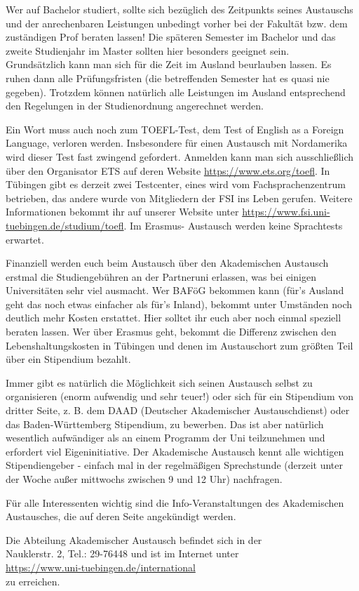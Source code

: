 Wer auf Bachelor studiert, sollte sich bezüglich des Zeitpunkts seines Austauschs und der anrechenbaren Leistungen unbedingt vorher bei der Fakultät bzw. dem zuständigen Prof beraten lassen! Die späteren Semester im Bachelor und das zweite Studienjahr im Master sollten hier besonders geeignet sein.\\
Grundsätzlich kann man sich für die Zeit im Ausland beurlauben lassen. Es ruhen dann alle Prüfungsfristen (die betreffenden Semester hat es quasi nie gegeben). Trotzdem können natürlich alle Leistungen im Ausland entsprechend den Regelungen in der Studienordnung angerechnet werden.

Ein Wort muss auch noch zum TOEFL-Test, dem Test of English as a Foreign Language, verloren werden. Insbesondere für einen Austausch mit Nordamerika wird dieser Test fast zwingend gefordert. Anmelden kann man sich ausschließlich über den Organisator ETS auf deren Website \url{https://www.ets.org/toefl}. In Tübingen gibt es derzeit zwei Testcenter, eines wird vom Fachsprachenzentrum betrieben, das andere wurde von Mitgliedern der FSI ins Leben gerufen. Weitere Informationen bekommt ihr auf unserer Website unter \url{https://www.fsi.uni-tuebingen.de/studium/toefl}.
Im Erasmus- Austausch werden keine Sprachtests erwartet.

Finanziell werden euch beim Austausch über den Akademischen Austausch erstmal die Studiengebühren an der Partneruni erlassen, was bei einigen Universitäten sehr viel ausmacht.  Wer BAFöG bekommen kann (für's Ausland geht das noch etwas einfacher als für's Inland), bekommt unter Umständen noch deutlich mehr Kosten erstattet. Hier solltet ihr euch aber noch einmal speziell beraten lassen. Wer über Erasmus geht, bekommt die Differenz zwischen den Lebenshaltungskosten in Tübingen und denen im Austauschort zum größten Teil über ein Stipendium bezahlt. 

Immer gibt es natürlich die Möglichkeit sich seinen Austausch selbst zu organisieren (enorm aufwendig und sehr teuer!) oder sich für ein Stipendium von dritter Seite, z. B. dem DAAD (Deutscher Akademischer Austauschdienst) oder das Baden-Württemberg Stipendium, zu bewerben.  Das ist aber natürlich wesentlich aufwändiger als an einem Programm der Uni teilzunehmen und erfordert viel Eigeninitiative. Der Akademische Austausch kennt alle wichtigen Stipendiengeber - einfach mal in der regelmäßigen Sprechstunde (derzeit unter der Woche außer mittwochs zwischen 9 und 12 Uhr) nachfragen.

Für alle Interessenten wichtig sind die Info-Veranstaltungen des Akademischen Austausches, die auf deren Seite angekündigt werden.
\medskip

Die Abteilung Akademischer Austausch befindet sich in der \\
Nauklerstr. 2, Tel.: 29-76448 und ist im Internet unter\\
\url{https://www.uni-tuebingen.de/international}\\
zu erreichen.
